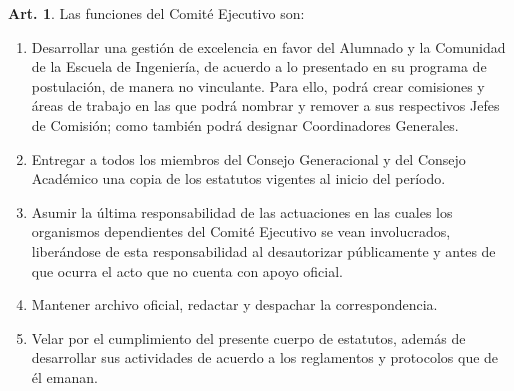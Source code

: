 \documentclass[letterpaper,11pt]{article}
\theoremstyle{definition}%
\newtheorem{art}{Art.} %
\begin{document}
\begin{art}\label{funcionesEjecutivo1}
	Las funciones del Comité Ejecutivo son:
	\begin{enumerate}
		\item Desarrollar una gestión de excelencia en favor del Alumnado y la Comunidad de la Escuela de Ingeniería, de acuerdo a lo presentado en su programa de postulación, de manera no vinculante. Para ello, podrá crear comisiones y áreas de trabajo en las que podrá nombrar y remover a sus respectivos Jefes de Comisión; como también podrá designar Coordinadores Generales.

		\item Entregar a todos los miembros del Consejo Generacional y del Consejo Académico una copia de los estatutos vigentes al inicio del período.

		\item Asumir la última responsabilidad de las actuaciones en las cuales los organismos dependientes del Comité Ejecutivo se vean involucrados, liberándose de esta responsabilidad al desautorizar públicamente y antes de que ocurra el acto que no cuenta con apoyo oficial.

		\item Mantener archivo oficial, redactar y despachar la correspondencia.

		\item Velar por el cumplimiento del presente cuerpo de estatutos, además de desarrollar sus actividades de acuerdo a los reglamentos y protocolos que de él emanan.
	\end{enumerate}
\end{art}
\end{document}
